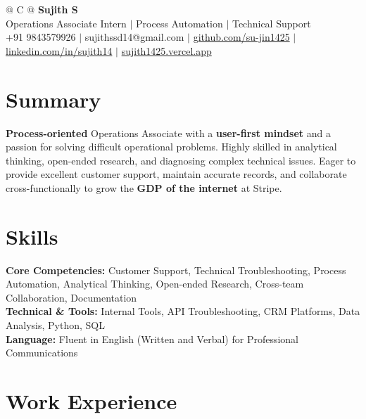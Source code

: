 \documentclass[a4paper,11pt]{article}
\newcommand{\ulink}[2]{\href{#1}{#2}}
\begin{document}
\pagestyle{empty}

\begin{tabularx}{\linewidth}{@{} C @{}}
{\color[HTML]{000000}\fontsize{30}{35}\selectfont\bfseries Sujith S} \\[5pt]
{\fontsize{10.5}{12.5}\selectfont\color[HTML]{3A3A3A}
Operations Associate Intern $|$ Process Automation $|$ Technical Support} \\[6pt]
{\fontsize{9.5}{11.5}\selectfont\textcolor[HTML]{3A3A3A}{+91 9843579926 $|$ sujithssd14@gmail.com $|$ \ulink{https://github.com/su-jin1425}{github.com/su-jin1425} $|$ \ulink{https://linkedin.com/in/sujith14}{linkedin.com/in/sujith14} $|$ \ulink{https://sujith1425.vercel.app}{sujith1425.vercel.app}}}
\end{tabularx}

\section{Summary}
\vspace{2pt}

{\color[HTML]{0A0A0A}\fontsize{11}{14}\selectfont
\textbf{Process-oriented} Operations Associate with a \textbf{user-first mindset} and a passion for solving difficult operational problems. Highly skilled in analytical thinking, open-ended research, and diagnosing complex technical issues. Eager to provide excellent customer support, maintain accurate records, and collaborate cross-functionally to grow the \textbf{GDP of the internet} at Stripe.}

\section{Skills}
\vspace{2pt}

{\color[HTML]{0A0A0A}\fontsize{11}{14}\selectfont
\textbf{Core Competencies:} Customer Support, Technical Troubleshooting, Process Automation, Analytical Thinking, Open-ended Research, Cross-team Collaboration, Documentation \\[2pt]
\textbf{Technical \& Tools:} Internal Tools, API Troubleshooting, CRM Platforms, Data Analysis, Python, SQL \\[2pt]
\textbf{Language:} Fluent in English (Written and Verbal) for Professional Communications}

\section{Work Experience}
\vspace{2pt}
\end{document}
